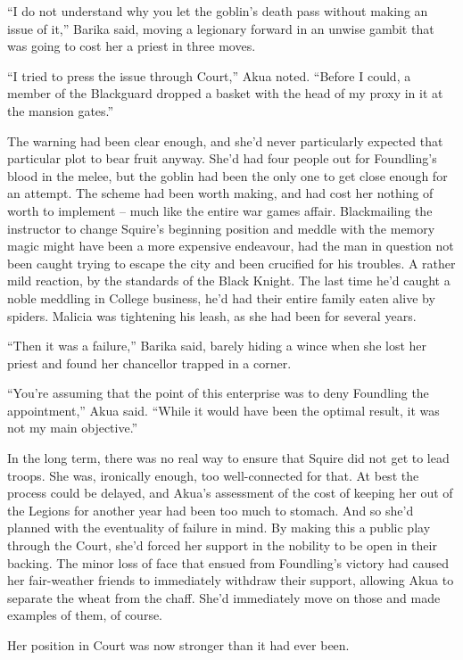 \documentclass[12pt, openany]{book}
\begin{document}
“I do not understand why you let the goblin’s death pass without making an issue of it,” Barika said, moving a legionary forward in an unwise gambit that was going to cost her a priest in three moves.

“I tried to press the issue through Court,” Akua noted. “Before I could, a member of the Blackguard dropped a basket with the head of my proxy in it at the mansion gates.”

The warning had been clear enough, and she’d never particularly expected that particular plot to bear fruit anyway. She’d had four people out for Foundling’s blood in the melee, but the goblin had been the only one to get close enough for an attempt. The scheme had been worth making, and had cost her nothing of worth to implement – much like the entire war games affair. Blackmailing the instructor to change Squire’s beginning position and meddle with the memory magic might have been a more expensive endeavour, had the man in question not been caught trying to escape the city and been crucified for his troubles. A rather mild reaction, by the standards of the Black Knight. The last time he’d caught a noble meddling in College business, he’d had their entire family eaten alive by spiders. Malicia was tightening his leash, as she had been for several years.

“Then it was a failure,” Barika said, barely hiding a wince when she lost her priest and found her chancellor trapped in a corner.

“You’re assuming that the point of this enterprise was to deny Foundling the appointment,” Akua said. “While it would have been the optimal result, it was not my main objective.”

In the long term, there was no real way to ensure that Squire did not get to lead troops. She was, ironically enough, too well-connected for that. At best the process could be delayed, and Akua’s assessment of the cost of keeping her out of the Legions for another year had been too much to stomach. And so she’d planned with the eventuality of failure in mind. By making this a public play through the Court, she’d forced her support in the nobility to be open in their backing. The minor loss of face that ensued from Foundling’s victory had caused her fair-weather friends to immediately withdraw their support, allowing Akua to separate the wheat from the chaff. She’d immediately move on those and made examples of them, of course.

Her position in Court was now stronger than it had ever been.
\end{document}
